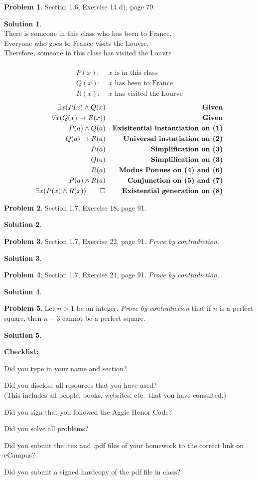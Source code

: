 \documentclass{article}
\theoremstyle{definition}
\newtheorem{problem}{Problem}
\newtheorem*{solution}{Solution}
\newcommand{\checklist}{\noindent\textbf{Checklist:}
\begin{compactitem}[$\Box$] 
\item Did you type in your name and section? 
\item Did you disclose all resources that you have used? \\
(This includes all people, books, websites, etc.\ that you have consulted.)
\item Did you sign that you followed the Aggie Honor Code? 
\item Did you solve all problems? 
\item Did you submit the .tex and .pdf files of your homework to the correct link on eCampus?
\item Did you submit a signed hardcopy of the pdf file in class? 
\end{compactitem}
}
\begin{document}
\begin{problem} Section 1.6, Exercise 14 d), page 79.  
\end{problem}
\begin{solution}\ \\
There is someone in this class who has been to France. \\
Everyone who goes to France visits the Louvre. \\
Therefore, someone in this class has visited the Louvre \\ \ \\
\begin{align*}
  P(x):&\; x \text{ is in this class} \\
  Q(x):&\; x \text{ has been to France} \\
  R(x):&\; x \text{ has visited the Lourve}
\end{align*}
\begin{align}
  \exists x(P(x) \land Q(x)& &\textbf{Given} \\
  \forall x(Q(x) \rightarrow R(x))& &\textbf{Given} \\
  P(a) \land Q(a)& &\textbf{Exisitential instantiation on (1)} \\
  Q(a) \rightarrow R(a)& &\textbf{Universal instatiation on (2)} \\
  P(a)& &\textbf{Simplification on (3)} \\
  Q(a)& &\textbf{Simplification on (3)} \\
  R(a)& &\textbf{Modus Ponnes on (4) and (6)} \\
  P(a) \land R(a)& &\textbf{Conjunction on (5) and (7)} \\
  \exists x(P(x) \land R(x)) \qed& &\textbf{Existential generation on (8)}
\end{align}
\end{solution}

\begin{problem} Section 1.7, Exercise 18, page 91.
\end{problem}
\begin{solution}
\end{solution}

\begin{problem} Section 1.7, Exercise 22, page 91.  \textsl{Prove by contradiction.}
\end{problem}
\begin{solution}
\end{solution}

\begin{problem} Section 1.7, Exercise 24, page 91.  \textsl{Prove by contradiction.}
\end{problem}
\begin{solution}
\end{solution}

\begin{problem} Let $n>1$ be an integer. \textsl{Prove by contradiction} that 
if $n$ is a perfect square, then $n+3$ cannot be a perfect square. 
\end{problem}
\begin{solution}
\end{solution}

\goodbreak
\checklist
\end{document}
